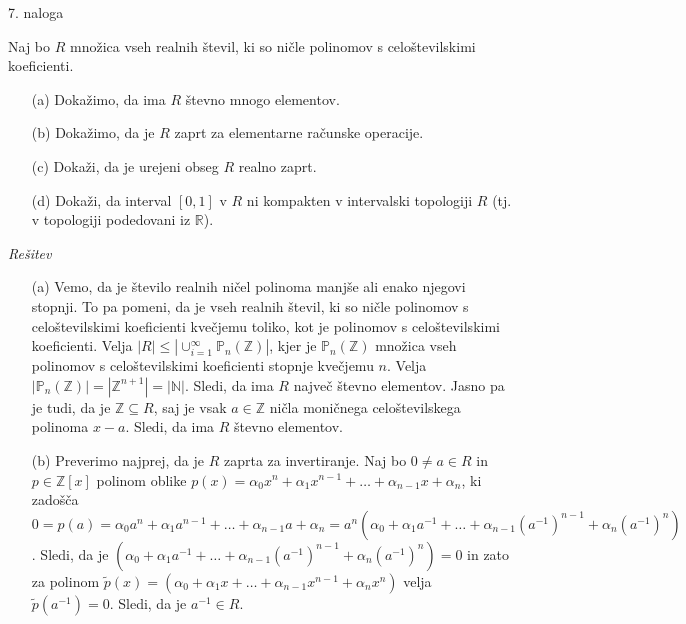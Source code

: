 \documentclass[a4paper, 12pt]{article}
\newcommand{\N}{\mathbb{N}}
\newcommand{\Z}{\mathbb{Z}}
\newcommand{\R}{\mathbb{R}}
\begin{document}
\begin{flushleft}
7. naloga
\end{flushleft}
Naj bo $R$ množica vseh realnih števil, ki so ničle polinomov s celoštevilskimi koeficienti.
\begin{enumerate}
\item[(a)] Dokažimo, da ima $R$ števno mnogo elementov.
\item[(b)] Dokažimo, da je $R$ zaprt za elementarne računske operacije.
\item[(c)] Dokaži, da je urejeni obseg $R$ realno zaprt.
\item[(d)] Dokaži, da interval $[0,1]$ v $R$ ni kompakten v intervalski topologiji $R$ (tj. v topologiji podedovani iz $\R$).
\end{enumerate}
\emph{Rešitev}
\begin{enumerate}
\item[(a)] Vemo, da je število realnih ničel polinoma manjše ali enako njegovi stopnji. To pa pomeni, da je vseh realnih števil, ki so ničle polinomov s celoštevilskimi koeficienti kvečjemu toliko, kot je polinomov s celoštevilskimi koeficienti. Velja $|R| \le |\cup_{i=1}^\infty \mathbb{P}_n(\Z)|$, kjer je $\mathbb{P}_n(\Z)$ množica vseh polinomov s celoštevilskimi koeficienti stopnje kvečjemu $n$. Velja $|\mathbb{P}_n(\Z)| = |\Z^{n+1}| = |\N|$. Sledi, da ima  $R$ največ števno elementov. Jasno pa je tudi, da je $\Z \subseteq R$, saj je vsak $a\in \Z$ ničla moničnega celoštevilskega polinoma $x-a$. Sledi, da ima $R$ števno elementov.

\item[(b)] Preverimo najprej, da je $R$ zaprta za invertiranje. Naj bo $0\neq a\in R$ in $p\in \Z[x]$ polinom oblike $p(x) = \alpha_0 x^n + \alpha_1 x^{n-1} + \dots  + \alpha_{n-1}x +\alpha_n$, ki zadošča $0=p(a) =  \alpha_0 a^n + \alpha_1 a^{n-1} + \dots  + \alpha_{n-1}a +\alpha_n = a^n (\alpha_0 + \alpha_1 a^{-1} + \dots + \alpha_{n-1} (a^{-1})^{n-1} + \alpha_n (a^{-1})^{n})$. Sledi, da je $(\alpha_0 + \alpha_1 a^{-1} + \dots + \alpha_{n-1} (a^{-1})^{n-1} + \alpha_n (a^{-1})^{n}) = 0$ in zato za polinom $\tilde{p}(x) = (\alpha_0 + \alpha_1 x + \dots + \alpha_{n-1} x^{n-1} + \alpha_n x^{n})$ velja $\tilde{p}(a^{-1}) = 0$. Sledi, da je $a^{-1}\in R$.


\end{enumerate}
\end{document}
